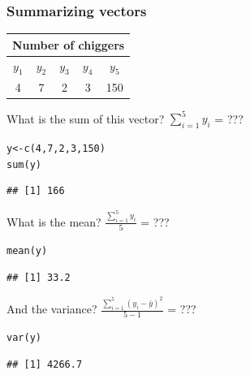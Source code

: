 \documentclass[color=usenames,dvipsnames]{beamer}\usepackage[]{graphicx}\usepackage[]{color}
\makeatletter
\newcommand{\hlnum}[1]{\textcolor[rgb]{0.69,0.494,0}{#1}}%
\newcommand{\hlstd}[1]{\textcolor[rgb]{0,0,0}{#1}}%
\newcommand{\hlkwb}[1]{\textcolor[rgb]{0,0.341,0.682}{#1}}%
\newcommand{\hlkwd}[1]{\textcolor[rgb]{0.004,0.004,0.506}{#1}}%
\newenvironment{kframe}{%
 \def\at@end@of@kframe{}%
 \ifinner\ifhmode%
  \def\at@end@of@kframe{\end{minipage}}%
  \begin{minipage}{\columnwidth}%
 \fi\fi%
 \def\FrameCommand##1{\hskip\@totalleftmargin \hskip-\fboxsep
 \colorbox{shadecolor}{##1}\hskip-\fboxsep
     \hskip-\linewidth \hskip-\@totalleftmargin \hskip\columnwidth}%
 \MakeFramed {\advance\hsize-\width
   \@totalleftmargin\z@ \linewidth\hsize
   \@setminipage}}%
 {\par\unskip\endMakeFramed%
 \at@end@of@kframe}
\newenvironment{knitrout}{}{} %
\makeatother
\begin{document}
\begin{frame}[fragile]
  \frametitle{Summarizing vectors}
  \small
  \begin{center}
    \begin{tabular}{ccccc}
      \hline
      \multicolumn{5}{c}{Number of chiggers} \\
      \hline %
      $y_1$ & $y_2$ & $y_3$ & $y_4$ & $y_5$ \\
      \hline
      4 & 7 & 2 & 3 & 150 \\
      \hline
    \end{tabular}
  \end{center}
What is the sum of this vector? $\sum_{i=1}^5 y_i$ = ???
  \pause
\begin{knitrout}\footnotesize
{}\color{fgcolor}\begin{kframe}
\begin{alltt}
\hlstd{y} \hlkwb{<-} \hlkwd{c}\hlstd{(}\hlnum{4}\hlstd{,}\hlnum{7}\hlstd{,}\hlnum{2}\hlstd{,}\hlnum{3}\hlstd{,}\hlnum{150}\hlstd{)}
\hlkwd{sum}\hlstd{(y)}
\end{alltt}
\begin{verbatim}
## [1] 166
\end{verbatim}
\end{kframe}
\end{knitrout}
\pause
What is the mean? $\frac{\sum_{i=1}^5 y_i}{5}$ = ???
  \pause
\begin{knitrout}\footnotesize
{}\color{fgcolor}\begin{kframe}
\begin{alltt}
\hlkwd{mean}\hlstd{(y)}
\end{alltt}
\begin{verbatim}
## [1] 33.2
\end{verbatim}
\end{kframe}
\end{knitrout}
  \pause
  And the variance? $\frac{\sum_{i=1}^5 (y_i - \bar{y})^2}{5-1}$ = ???
\begin{knitrout}\footnotesize
{}\color{fgcolor}\begin{kframe}
\begin{alltt}
\hlkwd{var}\hlstd{(y)}
\end{alltt}
\begin{verbatim}
## [1] 4266.7
\end{verbatim}
\end{kframe}
\end{knitrout}
\end{frame}
\end{document}
